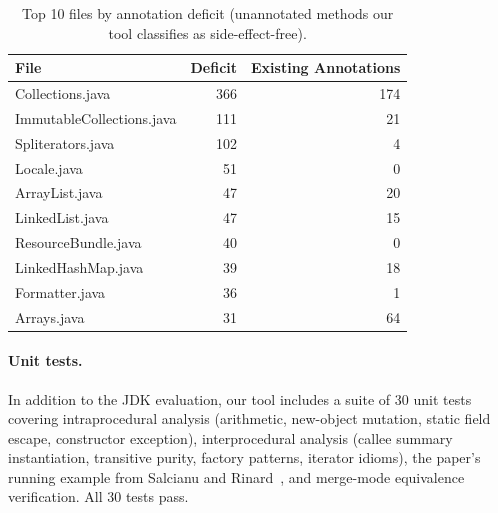 \begin{table}[h]
\centering
\caption{Top 10 files by annotation deficit (unannotated methods our tool classifies as side-effect-free).}
\label{tab:deficit}
\begin{tabular}{lrr}
\toprule
\textbf{File} & \textbf{Deficit} & \textbf{Existing Annotations} \\
\midrule
Collections.java          & 366 & 174 \\
ImmutableCollections.java & 111 &  21 \\
Spliterators.java         & 102 &   4 \\
Locale.java               &  51 &   0 \\
ArrayList.java            &  47 &  20 \\
LinkedList.java           &  47 &  15 \\
ResourceBundle.java       &  40 &   0 \\
LinkedHashMap.java        &  39 &  18 \\
Formatter.java            &  36 &   1 \\
Arrays.java               &  31 &  64 \\
\bottomrule
\end{tabular}
\end{table}


\paragraph{Unit tests.}
In addition to the JDK evaluation, our tool includes a suite of 30 unit tests covering intraprocedural analysis (arithmetic, new-object mutation, static field escape, constructor exception), interprocedural analysis (callee summary instantiation, transitive purity, factory patterns, iterator idioms), the paper's running example from Salcianu and Rinard~\cite{salcianu2005purity}, and merge-mode equivalence verification.
All 30 tests pass.
